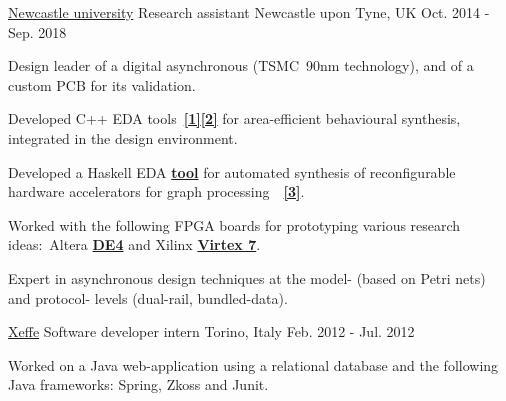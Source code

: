
\begin{cventries}

\cventry
{\href{https://www.ncl.ac.uk/}{\color{myblue}Newcastle university}}
{Research assistant} %
{Newcastle upon Tyne, UK} %
{Oct. 2014 - Sep. 2018} %
{ 
\begin{cvitems}
\item {Design leader of a digital asynchronous 
\href{https://ieeexplore.ieee.org/document/8342264/}{}
(TSMC~90nm technology), and of a custom PCB for its validation.}
\item {Developed C++ EDA
tools~{\color{myblue}\href{https://github.com/tuura/shutters}{\textbf{[1]}}}{\color{myblue}\href{https://github.com/tuura/scenco}{\textbf{[2]}}}
for area-efficient behavioural synthesis, integrated in the
\href{https://workcraft.org/}{}
design environment.}
\item {Developed a Haskell EDA 
{\color{myblue}\href{https://github.com/tuura/fantasi/tree/master/doc}{\textbf{tool}}}
for automated synthesis of reconfigurable hardware accelerators for graph
processing~~{\color{myblue}\href{https://poets-project.org/publications}{\textbf{[3]}}}.}
\item {Worked with the following FPGA boards for prototyping various research 
ideas:~Altera 	
{\color{myblue}\href{https://www.altera.com/solutions/partners/partner-profile/terasic-inc-/board/de4-stratix-iv-development-board.html\#overview}{\textbf{DE4}}}
and Xilinx 	
{\color{myblue}\href{https://www.xilinx.com/products/boards-and-kits/ek-v7-vc707-g.html}{\textbf{Virtex
 7}}}.}
\item {Expert in asynchronous design techniques at the model- (based on 
Petri nets) and protocol- levels (dual-rail, bundled-data).}
\end{cvitems}
}


\cventry
{\color{myblue}\href{http://www.xeffe.it/}{Xeffe}}
{Software developer intern}
{Torino, Italy}
{Feb. 2012 - Jul. 2012}
{
\begin{cvitems}
Worked on a Java web-application using a relational database and 
the following Java frameworks: Spring, Zkoss and Junit.
\end{cvitems}
}


\end{cventries}
\vspace{-1mm}